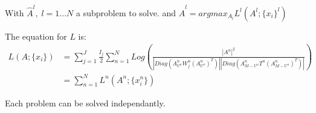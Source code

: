 With $\hat{A}^l, \; l = 1...N$ a subproblem to solve.
and $\hat{A}^l = argmax_{A_l}L^l (A^l; \{x_i\}^l)$

The equation for $L$ is:
$$
\begin{array}{cl}
  L(A; \{x_i\}) & = \sum\limits_{j = 1}^J \frac{I_j}{2} \sum\limits_{n = 1}^N Log \left ( \frac{|A^n|^2}{|Diag(A_{U^n}^n W_j^n (A_{U^n}^n)^T)||Diag(A_{M - U^n}^n T^n (A_{M - U^n}^n)^T)|} \right ) \\
  & = \sum\limits_{n = 1}^N L^n ( A^n; \{x_i^n\})
\end{array} 
$$

Each problem can be solved independantly.

